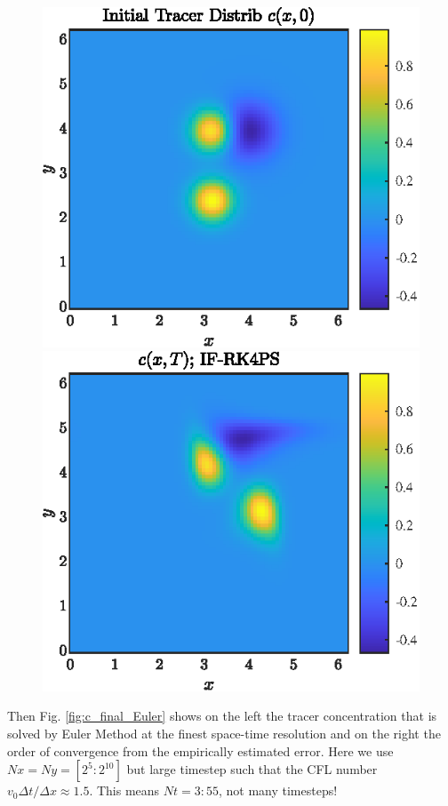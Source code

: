 \documentclass[11pt,letterpaper]{article}
\begin{document}
\begin{figure}[H]
    \centering
    \includegraphics{figs/c_init_IF-RK4PS}
    \includegraphics{figs/c_final_IF-RK4PS}
    \caption{}\label{fig:c_init_IF}
\end{figure}
Then Fig. \ref{fig:c_final_Euler} shows on the left the tracer concentration that is solved by Euler Method at the finest space-time resolution and on the right the order of convergence from the empirically estimated error. Here we use $Nx = Ny= [2^5:2^{10}]$ but large timestep such that the CFL number $v_0\Delta t/\Delta x \approx 1.5$. This means $Nt = 3:55$, not many timesteps!
\end{document}
